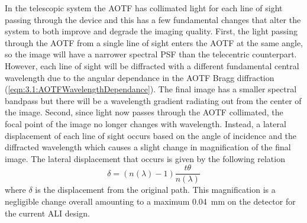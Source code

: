 \documentclass[12pt]{article}
\begin{document}
In the telescopic system the AOTF has collimated light for each line of sight passing through the device and this has a few fundamental changes that alter the system to both improve and degrade the imaging quality. First, the light passing through the AOTF from a single line of sight enters the AOTF at the same angle, so the image will have a narrower spectral PSF than the telecentric counterpart. However, each line of sight will be diffracted with a different fundamental central wavelength due to the angular dependance in the AOTF Bragg diffraction (\autoref{eqn:3.1:AOTFWavelengthDependance}). The final image has a smaller spectral bandpass but there will be a wavelength gradient radiating out from the center of the image. Second, since light now passes through the AOTF collimated, the focal point of the image no longer changes with wavelength. Instead, a lateral displacement of each line of sight occurs based on the angle of incidence and the diffracted wavelength which causes a slight change in magnification of the final image. The lateral displacement that occurs is given by the following relation
\begin{equation}
    \delta = (n(\lambda)-1)\frac{t\theta}{n(\lambda)}
    \label{eqn:3.2:planeParallelDiplacement}
\end{equation}
where $\delta$ is the displacement from the original path. This magnification is a negligible change overall amounting to a maximum 0.04~mm on the detector for the current ALI design.

\end{document}
